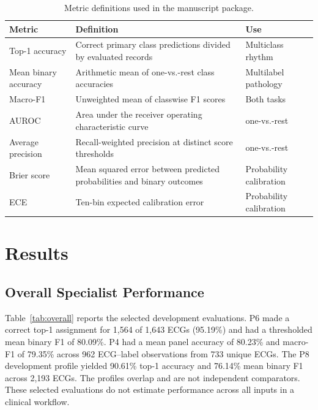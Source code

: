 \documentclass[life,article,submit,moreauthors]{Definitions/mdpi}
\begin{document}
\begin{table}[htbp]
\caption{Metric definitions used in the manuscript package.\label{tab:metrics}}
\centering
\small
\begin{tabular}{@{}p{.21\linewidth}p{.53\linewidth}p{.20\linewidth}@{}}
\toprule
\textbf{Metric} & \textbf{Definition} & \textbf{Use} \\
\midrule
Top-1 accuracy & Correct primary class predictions divided by evaluated records & Multiclass rhythm \\
Mean binary accuracy & Arithmetic mean of one-vs.-rest class accuracies & Multilabel pathology \\
Macro-F1 & Unweighted mean of classwise F1 scores & Both tasks \\
AUROC & Area under the receiver operating characteristic curve & one-vs.-rest \\
Average precision & Recall-weighted precision at distinct score thresholds & one-vs.-rest \\
Brier score & Mean squared error between predicted probabilities and binary outcomes & Probability calibration \\
ECE & Ten-bin expected calibration error & Probability calibration \\
\bottomrule
\end{tabular}
\end{table}





\section{Results}

\subsection{Overall Specialist Performance}


Table~\ref{tab:overall} reports the selected development evaluations. P6 made a correct top-1 assignment for 1,564 of 1,643 ECGs (95.19\%) and had a thresholded mean binary F1 of 80.09\%. P4 had a mean panel accuracy of 80.23\% and macro-F1 of 79.35\% across 962 ECG--label observations from 733 unique ECGs. The P8 development profile yielded 90.61\% top-1 accuracy and 76.14\% mean binary F1 across 2,193 ECGs. The profiles overlap and are not independent comparators. These selected evaluations do not estimate performance across all inputs in a clinical workflow.
\end{document}
